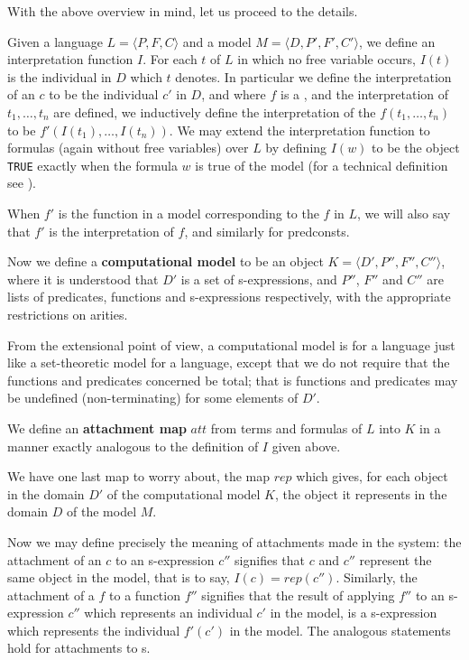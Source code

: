 With the above overview in mind, let us proceed to the details.

Given a language $L=\langle P,F,C\rangle$ and a model 
$M=\langle D,P',F',C'\rangle$, we define an interpretation function $I$.
For each {\term} $t$ of $L$ in which no free variable occurs, $I(t)$ is the 
individual in $D$ which $t$ denotes.
In particular we define the interpretation of an {\indconst} $c$ to be the 
individual $c'$ in $D$, and where $f$ is a {\funconst}, and the interpretation 
of {\term} $t_1,\ldots,t_n$ are defined, we inductively define the 
interpretation of the {\term} 
$f(t_1,\ldots,t_n)$ to be $f'(I(t_1),\ldots,I(t_n))$.
We may extend the interpretation function to formulas (again without free 
variables) over $L$ by defining $I(w)$ to be the object {\tt TRUE} exactly 
when the formula $w$ is true of the model (for a technical definition 
see \cite{kleene2}).

When $f'$ is the function in a model corresponding to the {\funconst} $f$ in 
$L$, we will also say that $f'$ is the interpretation of $f$, and similarly 
for predconsts.

Now we define a {\bf computational model} to be an object
$K=\langle D',P'',F'',C''\rangle$, where it is understood that $D'$ is a set
of s-expressions, and $P''$, $F''$ and $C''$ are lists of {\HG} predicates,
functions and s-expressions respectively, with the appropriate restrictions on 
arities.

From the extensional point of view, a computational model is for a language
just like a set-theoretic model for a language, except that we do not require
that the functions and predicates concerned be total; that is functions and
predicates may be undefined (non-terminating) for some elements
of $D'$.

We define an {\bf attachment map} $att$ from terms and formulas of $L$ into
$K$ in a manner exactly analogous to the definition of $I$ given above.

We have one last map to worry about, the map {\bf $rep$} which gives, for each
object in the domain $D'$ of the computational model $K$, the object it
represents in the domain $D$ of the model $M$.

Now we may define precisely the meaning of attachments made in the {\GF}
system: the attachment of an {\indconst} $c$ to an s-expression $c''$
signifies that $c$ and $c''$ represent the same object in the model, that is
to say, $I(c)=rep(c'')$.
Similarly, the attachment of a {\funconst} $f$ to a {\HG} function $f''$
signifies that the result of applying $f''$ to an s-expression $c''$ which
represents an individual $c'$ in the model, is a s-expression which represents
the individual $f'(c')$ in the model.
The analogous statements hold for attachments to {\predconst}s.

